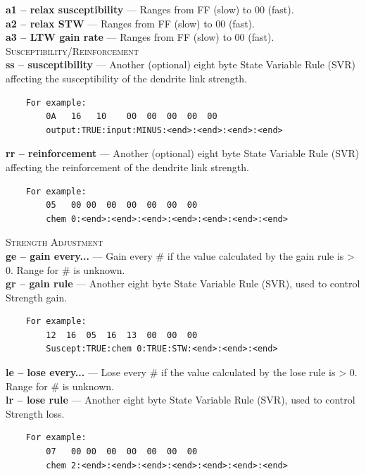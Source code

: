 \documentclass[11pt,twoside,a4paper]{article}
\begin{document}
\textbf{a1 -- relax susceptibility} --- Ranges from FF (slow) to 00 (fast). ~\\

\textbf{a2 -- relax STW} --- Ranges from FF (slow) to 00 (fast). ~\\

\textbf{a3 -- LTW gain rate} --- Ranges from FF (slow) to 00 (fast). ~\\

\textsc{Susceptibility/Reinforcement}~\\

\textbf{ss -- susceptibility} --- Another (optional) eight byte State Variable Rule (SVR) affecting the susceptibility of the dendrite link strength. %
\begin{verbatim}
	For example:
		0A	 16   10	00	00	00	00	00
		output:TRUE:input:MINUS:<end>:<end>:<end>:<end>
\end{verbatim}

\textbf{rr -- reinforcement} --- Another (optional) eight byte State Variable Rule (SVR) affecting the reinforcement of the dendrite link strength. %
\begin{verbatim}
	For example:
		05	 00	00	00	00	00	00	00
		chem 0:<end>:<end>:<end>:<end>:<end>:<end>:<end>
\end{verbatim}

\textsc{Strength Adjustment}~\\

\textbf{ge -- gain every...} --- Gain every \# if the value calculated by the gain rule is > 0. Range for \# is unknown. ~\\

\textbf{gr -- gain rule} --- Another eight byte State Variable Rule (SVR), used to control Strength gain. %
\begin{verbatim}
	For example:
		12	16	05	16	13	00	00	00	
		Suscept:TRUE:chem 0:TRUE:STW:<end>:<end>:<end>
\end{verbatim}

\textbf{le -- lose every...} --- Lose every \# if the value calculated by the lose rule is > 0. Range for \# is unknown. ~\\

\textbf{lr -- lose rule} --- Another eight byte State Variable Rule (SVR), used to control Strength loss. %
\begin{verbatim}
	For example:
		07	 00	00	00	00	00	00	00
		chem 2:<end>:<end>:<end>:<end>:<end>:<end>:<end>
\end{verbatim}
\end{document}
